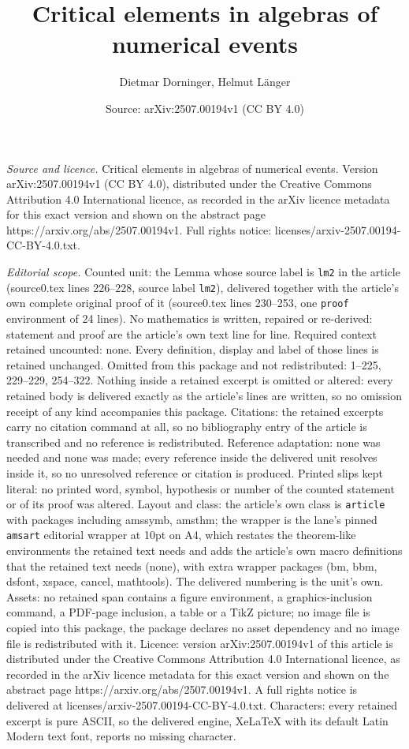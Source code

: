 \documentclass[10pt,a4paper]{amsart}
\title[Critical elements in algebras of numerical events]{Critical elements in algebras of numerical events}
\author{Dietmar Dorninger, Helmut L\"anger}
\date{Source: arXiv:2507.00194v1 (CC BY 4.0)}
\begin{document}
\maketitle

\noindent\emph{Source and licence.} Critical elements in algebras of numerical events. Version arXiv:2507.00194v1 (CC BY 4.0), distributed under the Creative Commons Attribution 4.0 International licence, as recorded in the arXiv licence metadata for this exact version and shown on the abstract page https://arxiv.org/abs/2507.00194v1. Full rights notice: licenses/arxiv-2507.00194-CC-BY-4.0.txt.\par\smallskip

\noindent\textit{Editorial scope.} Counted unit: the Lemma whose source label is \texttt{lm2} in the article (source0.tex lines 226--228, source label \texttt{lm2}), delivered together with the article's own complete original proof of it (source0.tex lines 230--253, one \texttt{proof} environment of 24 lines). No mathematics is written, repaired or re-derived: statement and proof are the article's own text line for line. Required context retained uncounted: none. Every definition, display and label of those lines is retained unchanged. Omitted from this package and not redistributed: 1--225, 229--229, 254--322. Nothing inside a retained excerpt is omitted or altered: every retained body is delivered exactly as the article's lines are written, so no omission receipt of any kind accompanies this package. Citations: the retained excerpts carry no citation command at all, so no bibliography entry of the article is transcribed and no reference is redistributed. Reference adaptation: none was needed and none was made; every reference inside the delivered unit resolves inside it, so no unresolved reference or citation is produced. Printed slips kept literal: no printed word, symbol, hypothesis or number of the counted statement or of its proof was altered. Layout and class: the article's own class is \texttt{article} with packages including amssymb, amsthm; the wrapper is the lane's pinned \texttt{amsart} editorial wrapper at 10pt on A4, which restates the theorem-like environments the retained text needs and adds the article's own macro definitions that the retained text needs (none), with extra wrapper packages (bm, bbm, dsfont, xspace, cancel, mathtools). The delivered numbering is the unit's own. Assets: no retained span contains a figure environment, a graphics-inclusion command, a PDF-page inclusion, a table or a TikZ picture; no image file is copied into this package, the package declares no asset dependency and no image file is redistributed with it. Licence: version arXiv:2507.00194v1 of this article is distributed under the Creative Commons Attribution 4.0 International licence, as recorded in the arXiv licence metadata for this exact version and shown on the abstract page https://arxiv.org/abs/2507.00194v1. A full rights notice is delivered at licenses/arxiv-2507.00194-CC-BY-4.0.txt. Characters: every retained excerpt is pure ASCII, so the delivered engine, XeLaTeX with its default Latin Modern text font, reports no missing character.
\end{document}
